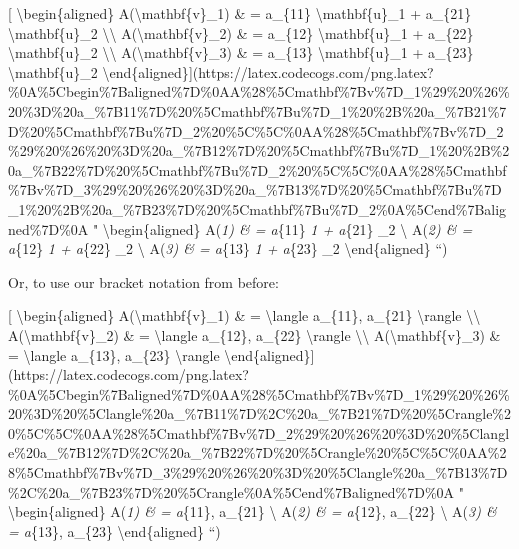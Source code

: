 \documentclass[]{article}
\begin{document}
{[} \textbackslash{}begin\{aligned\} A(\textbackslash{}mathbf\{v\}\_1) \& =
a\_\{11\} \textbackslash{}mathbf\{u\}\_1 + a\_\{21\}
\textbackslash{}mathbf\{u\}\_2 \textbackslash{}\textbackslash{}
A(\textbackslash{}mathbf\{v\}\_2) \& = a\_\{12\} \textbackslash{}mathbf\{u\}\_1
+ a\_\{22\} \textbackslash{}mathbf\{u\}\_2 \textbackslash{}\textbackslash{}
A(\textbackslash{}mathbf\{v\}\_3) \& = a\_\{13\} \textbackslash{}mathbf\{u\}\_1
+ a\_\{23\} \textbackslash{}mathbf\{u\}\_2
\textbackslash{}end\{aligned\}{]}(https://latex.codecogs.com/png.latex?\%0A\%5Cbegin\%7Baligned\%7D\%0AA\%28\%5Cmathbf\%7Bv\%7D\_1\%29\%20\%26\%20\%3D\%20a\_\%7B11\%7D\%20\%5Cmathbf\%7Bu\%7D\_1\%20\%2B\%20a\_\%7B21\%7D\%20\%5Cmathbf\%7Bu\%7D\_2\%20\%5C\%5C\%0AA\%28\%5Cmathbf\%7Bv\%7D\_2\%29\%20\%26\%20\%3D\%20a\_\%7B12\%7D\%20\%5Cmathbf\%7Bu\%7D\_1\%20\%2B\%20a\_\%7B22\%7D\%20\%5Cmathbf\%7Bu\%7D\_2\%20\%5C\%5C\%0AA\%28\%5Cmathbf\%7Bv\%7D\_3\%29\%20\%26\%20\%3D\%20a\_\%7B13\%7D\%20\%5Cmathbf\%7Bu\%7D\_1\%20\%2B\%20a\_\%7B23\%7D\%20\%5Cmathbf\%7Bu\%7D\_2\%0A\%5Cend\%7Baligned\%7D\%0A
" \textbackslash{}begin\{aligned\} A(\emph{1) \& = a}\{11\}
\emph{1 + a}\{21\} \_2 \textbackslash{} A(\emph{2)
\& = a}\{12\} \emph{1 + a}\{22\} \_2 \textbackslash{}
A(\emph{3) \& = a}\{13\} \emph{1 + a}\{23\} \_2
\textbackslash{}end\{aligned\} ``)

Or, to use our bracket notation from before:

{[} \textbackslash{}begin\{aligned\} A(\textbackslash{}mathbf\{v\}\_1) \& =
\textbackslash{}langle a\_\{11\}, a\_\{21\} \textbackslash{}rangle
\textbackslash{}\textbackslash{} A(\textbackslash{}mathbf\{v\}\_2) \& =
\textbackslash{}langle a\_\{12\}, a\_\{22\} \textbackslash{}rangle
\textbackslash{}\textbackslash{} A(\textbackslash{}mathbf\{v\}\_3) \& =
\textbackslash{}langle a\_\{13\}, a\_\{23\} \textbackslash{}rangle
\textbackslash{}end\{aligned\}{]}(https://latex.codecogs.com/png.latex?\%0A\%5Cbegin\%7Baligned\%7D\%0AA\%28\%5Cmathbf\%7Bv\%7D\_1\%29\%20\%26\%20\%3D\%20\%5Clangle\%20a\_\%7B11\%7D\%2C\%20a\_\%7B21\%7D\%20\%5Crangle\%20\%5C\%5C\%0AA\%28\%5Cmathbf\%7Bv\%7D\_2\%29\%20\%26\%20\%3D\%20\%5Clangle\%20a\_\%7B12\%7D\%2C\%20a\_\%7B22\%7D\%20\%5Crangle\%20\%5C\%5C\%0AA\%28\%5Cmathbf\%7Bv\%7D\_3\%29\%20\%26\%20\%3D\%20\%5Clangle\%20a\_\%7B13\%7D\%2C\%20a\_\%7B23\%7D\%20\%5Crangle\%0A\%5Cend\%7Baligned\%7D\%0A
" \textbackslash{}begin\{aligned\} A(\emph{1) \& = \langle a}\{11\},
a\_\{21\} \rangle \textbackslash{} A(\emph{2) \& = \langle a}\{12\},
a\_\{22\} \rangle \textbackslash{} A(\emph{3) \& = \langle a}\{13\},
a\_\{23\} \rangle \textbackslash{}end\{aligned\} ``)
\end{document}
